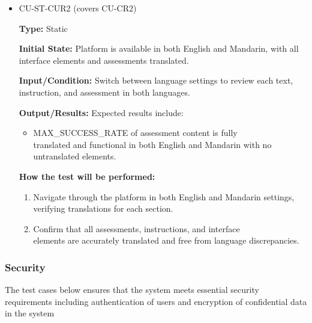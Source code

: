 \documentclass[12pt, titlepage]{article}
\begin{document}
\begin{itemize}
  \item CU-ST-CUR2 (covers CU-CR2)
  \begin{mdframed}[linewidth=0.5mm] 
    \textbf{Type:} Static \par 
    \textbf{Initial State:} Platform is available in both English and Mandarin, with all interface elements and assessments translated. \par 
    \textbf{Input/Condition:} Switch between language settings to review each text,\\
    instruction, and assessment in both languages. \par 
    \textbf{Output/Results:} Expected results include: 
    \begin{itemize} 
      \item MAX\_SUCCESS\_RATE of assessment content is fully \\translated and functional in both English and Mandarin with no \\untranslated elements. 
    \end{itemize} \par 
    \textbf{How the test will be performed:} 
    \begin{enumerate}[noitemsep] 
      \item Navigate through the platform in both English and Mandarin settings, \\ verifying translations for each section. 
      \item Confirm that all assessments, instructions, and interface \\elements are accurately translated and free from language discrepancies. 
    \end{enumerate} 
  \end{mdframed} 
\end{itemize}

\subsubsection{Security}

The test cases below ensures that the system meets essential 
security requirements including authentication of users and encryption of 
confidential data in the system
		
\end{document}
